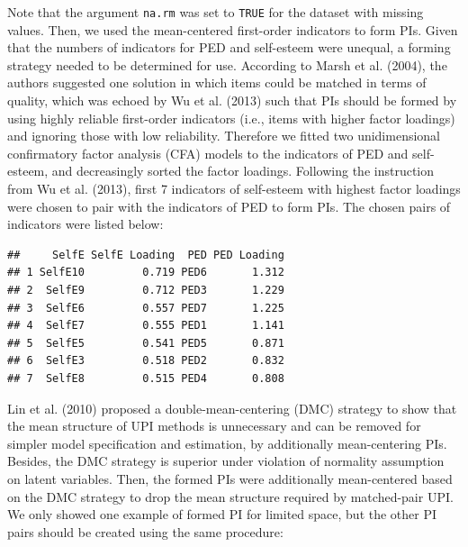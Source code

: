 \documentclass[
  man]{apa7}
\newenvironment{Shaded}{\begin{snugshade}}{\end{snugshade}}
\newcommand{\AttributeTok}[1]{\textcolor[rgb]{0.13,0.29,0.53}{#1}}
\newcommand{\CommentTok}[1]{\textcolor[rgb]{0.56,0.35,0.01}{\textit{#1}}}
\newcommand{\FunctionTok}[1]{\textcolor[rgb]{0.13,0.29,0.53}{\textbf{#1}}}
\newcommand{\NormalTok}[1]{#1}
\newcommand{\OtherTok}[1]{\textcolor[rgb]{0.56,0.35,0.01}{#1}}
\newcommand{\SpecialCharTok}[1]{\textcolor[rgb]{0.81,0.36,0.00}{\textbf{#1}}}
\begin{document}
Note that the argument \texttt{na.rm} was set to \texttt{TRUE} for the dataset with missing values. Then, we used the mean-centered first-order indicators to form PIs. Given that the numbers of indicators for PED and self-esteem were unequal, a forming strategy needed to be determined for use. According to Marsh et al. (2004), the authors suggested one solution in which items could be matched in terms of quality, which was echoed by Wu et al. (2013) such that PIs should be formed by using highly reliable first-order indicators (i.e., items with higher factor loadings) and ignoring those with low reliability. Therefore we fitted two unidimensional confirmatory factor analysis (CFA) models to the indicators of PED and self-esteem, and decreasingly sorted the factor loadings. Following the instruction from Wu et al. (2013), first 7 indicators of self-esteem with highest factor loadings were chosen to pair with the indicators of PED to form PIs. The chosen pairs of indicators were listed below:

\begin{verbatim}
##     SelfE SelfE Loading  PED PED Loading
## 1 SelfE10         0.719 PED6       1.312
## 2  SelfE9         0.712 PED3       1.229
## 3  SelfE6         0.557 PED7       1.225
## 4  SelfE7         0.555 PED1       1.141
## 5  SelfE5         0.541 PED5       0.871
## 6  SelfE3         0.518 PED2       0.832
## 7  SelfE8         0.515 PED4       0.808
\end{verbatim}

Lin et al. (2010) proposed a double-mean-centering (DMC) strategy to show that the mean structure of UPI methods is unnecessary and can be removed for simpler model specification and estimation, by additionally mean-centering PIs. Besides, the DMC strategy is superior under violation of normality assumption on latent variables. Then, the formed PIs were additionally mean-centered based on the DMC strategy to drop the mean structure required by matched-pair UPI. We only showed one example of formed PI for limited space, but the other PI pairs should be created using the same procedure:

\begin{Shaded}
\end{Shaded}
\end{document}
